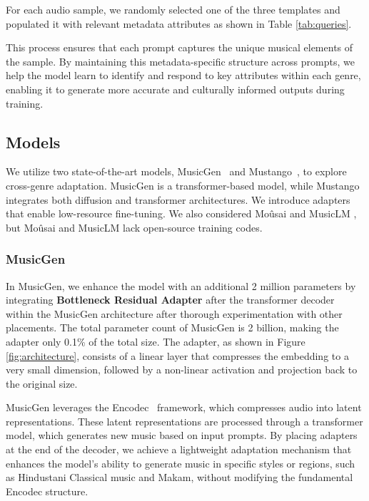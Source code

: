 For each audio sample, we randomly selected one of the three templates and populated it with relevant metadata attributes as shown in Table \ref{tab:queries}.

\noindent This process ensures that each prompt captures the unique musical elements of the sample. By maintaining this metadata-specific structure across prompts, we help the model learn to identify and respond to key attributes within each genre, enabling it to generate more accurate and culturally informed outputs during training.

\subsection{Models}
We utilize two state-of-the-art models, MusicGen~\cite{c:23} and Mustango~\cite{melechovsky-etal-2024-mustango}, to explore cross-genre adaptation. MusicGen is a transformer-based model, while Mustango integrates both diffusion and transformer architectures. We introduce adapters~\cite{pfeiffer-etal-2020-adapterhub} that enable low-resource fine-tuning. We also considered Moûsai \cite{c:24} and MusicLM \cite{agostinelli2023musiclm}, but Moûsai and MusicLM lack open-source training codes.

\subsubsection{MusicGen}
In MusicGen, we enhance the model with an additional 2 million parameters by integrating \textbf{Bottleneck Residual Adapter} after the transformer decoder within the MusicGen architecture after thorough experimentation with other placements. The total parameter count of MusicGen is 2 billion, making the adapter only 0.1\% of the total size. The adapter, as shown in Figure \ref{fig:architecture}, consists of a linear layer that compresses the embedding to a very small dimension, followed by a non-linear activation and projection back to the original size.

MusicGen leverages the Encodec~\cite{defossez2022highfi} framework, which compresses audio into latent representations. These latent representations are processed through a transformer model, which generates new music based on input prompts. By placing adapters at the end of the decoder, we achieve a lightweight adaptation mechanism that enhances the model’s ability to generate music in specific styles or regions, such as Hindustani Classical music and Makam, without modifying the fundamental Encodec structure.
\vspace{-1pt}
